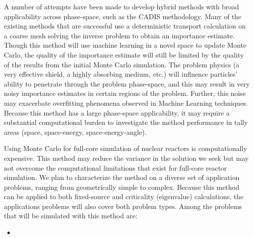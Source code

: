 \documentclass[letterpaper,12pt]{article}
\begin{document}

A number of attempts have been made to develop hybrid methods with broad
applicability across phase-space, such as the CADIS
methodology\cite{haghighat_monte_2003}. Many of the
existing methods that are successful use a deterministic transport
calculation on a coarse mesh solving the inverse problem to obtain an importance
estimate\cite{zhang_global_2014, zhang_adjoint-based_2011, haghighat_monte_2003,
hendricks_mcnp_1985}. Though this method will use machine learning in a novel space to
update Monte Carlo, the quality of the importance estimate will still be limited
by the quality of the results from the initial Monte Carlo simulation. The
problem physics (a very effective shield, a highly absorbing medium, etc.) will
influence particles' ability to penetrate through the problem phase-space, and
this may result in very noisy importance estimates in certain regions of the
problem\cite{van_wijk_easy_2011}. Further, this noise may exacerbate overfitting phenomena observed in
Machine Learning techniques. Because this method has a large phase-space
applicability, it may require a substantial computational burden to investigate
the method performance in tally areas (space, space-energy, space-energy-angle).

Using Monte Carlo for full-core simulation of nuclear reactors is
computationally expensive\cite{martin_challenges_2012}. This method may reduce
the variance in the solution we seek but may not overcome the computational
limitations that exist for full-core reactor simulation. We plan to
characterize the method on a diverse set of application problems, ranging from
geometrically simple to complex. Because this method can be applied to both
fixed-source and criticality (eigenvalue) calculations, the applications
problems will also cover both problem types. Among the problems that will be
simulated with this method are:
\begin{itemize}
  \item
\end{itemize}
\end{document}
